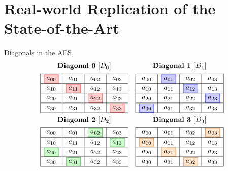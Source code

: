\documentclass{beamer}
\newenvironment{tres important}[2][]{
	\setkeys{EmphEqEnv}{#2}
	\setkeys{EmphEqOpt}{box={\setlength{\fboxsep}{10pt}\fcolorbox{myNewColorA}{white}},#1}
	\EmphEqMainEnv}
{\endEmphEqMainEnv}
\begin{document}
\section{Real-world Replication of the State-of-the-Art}
\begin{frame}{Diagonals in the AES}
  \[
\begin{array}{cc}
\textbf{Diagonal 0}~[D_0] & \textbf{Diagonal 1}~[D_1] \\[1ex]
\begin{array}{|c|c|c|c|}
\hline
\fcolorbox{red}{red!20}{$a_{00}$} & a_{01} & a_{02} & a_{03} \\
\hline
a_{10} & \fcolorbox{red}{red!20}{$a_{11}$} & a_{12} & a_{13} \\
\hline
a_{20} & a_{21} & \fcolorbox{red}{red!20}{$a_{22}$} & a_{23} \\
\hline
a_{30} & a_{31} & a_{32} & \fcolorbox{red}{red!20}{$a_{33}$} \\
\hline
\end{array}
&
\begin{array}{|c|c|c|c|}
\hline
a_{00} & \fcolorbox{blue}{blue!20}{$a_{01}$} & a_{02} & a_{03} \\
\hline
a_{10} & a_{11} & \fcolorbox{blue}{blue!20}{$a_{12}$} & a_{13} \\
\hline
a_{20} & a_{21} & a_{22} & \fcolorbox{blue}{blue!20}{$a_{23}$} \\
\hline
\fcolorbox{blue}{blue!20}{$a_{30}$} & a_{31} & a_{32} & a_{33} \\
\hline
\end{array}
\\[6ex]
\textbf{Diagonal 2}~[D_2] & \textbf{Diagonal 3}~[D_3] \\[1ex]
\begin{array}{|c|c|c|c|}
\hline
a_{00} & a_{01} & \fcolorbox{green!50!black}{green!20}{$a_{02}$} & a_{03} \\
\hline
a_{10} & a_{11} & a_{12} & \fcolorbox{green!50!black}{green!20}{$a_{13}$} \\
\hline
\fcolorbox{green!50!black}{green!20}{$a_{20}$} & a_{21} & a_{22} & a_{23} \\
\hline
a_{30} & \fcolorbox{green!50!black}{green!20}{$a_{31}$} & a_{32} & a_{33} \\
\hline
\end{array}
&
\begin{array}{|c|c|c|c|}
\hline
a_{00} & a_{01} & a_{02} & \fcolorbox{orange!80!black}{orange!20}{$a_{03}$} \\
\hline
\fcolorbox{orange!80!black}{orange!20}{$a_{10}$} & a_{11} & a_{12} & a_{13} \\
\hline
a_{20} & \fcolorbox{orange!80!black}{orange!20}{$a_{21}$} & a_{22} & a_{23} \\
\hline
a_{30} & a_{31} & \fcolorbox{orange!80!black}{orange!20}{$a_{32}$} & a_{33} \\
\hline
\end{array}
\end{array}
\]
  
\end{frame}
\end{document}
